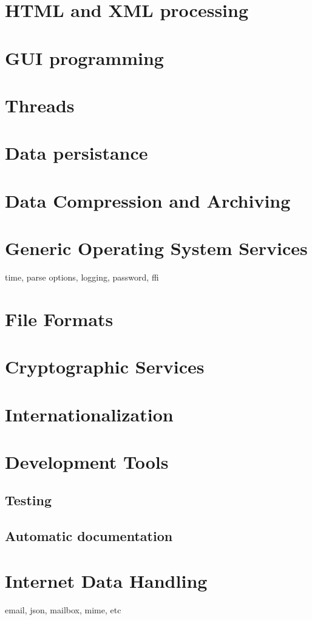 \documentclass[10pt,english]{book}
\begin{document}

\chapter{HTML and XML processing}


\chapter{GUI programming}


\chapter{Threads}


\chapter{Data persistance}


\chapter{Data Compression and Archiving}


\chapter{Generic Operating System Services}

time, parse options, logging, password, ffi


\chapter{File Formats}


\chapter{Cryptographic Services}


\chapter{Internationalization}


\chapter{Development Tools}

\section{Testing}

\section{Automatic documentation}


\chapter{Internet Data Handling}

email, json, mailbox, mime, etc

\printindex
\end{document}
